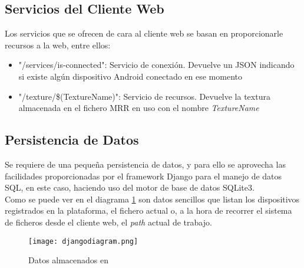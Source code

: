 \subsection{Servicios del Cliente Web}
Los servicios que se ofrecen de cara al cliente web se basan en proporcionarle recursos a la web, entre ellos:
\begin{itemize}
\item "\slash services/is-connected": Servicio de conexión. Devuelve un JSON indicando si existe algún dispositivo Android conectado en ese momento
\item "\slash texture/\$(TextureName)": Servicio de recursos. Devuelve la textura almacenada en el fichero MRR en uso con el nombre \textit{TextureName}
\end{itemize}

\subsection{Persistencia de Datos}
Se requiere de una pequeña persistencia de datos, y para ello se aprovecha las facilidades proporcionadas por el framework Django para el manejo de datos SQL, en este caso, haciendo uso del motor de base de datos SQLite3.\\

Como se puede ver en el diagrama \ref{fig:djangodiagram} son datos sencillos que listan los dispositivos registrados en la plataforma, el fichero actual o, a la hora de recorrer el sistema de ficheros desde el cliente web, el \textit{path} actual de trabajo.

\begin{figure}[h!]
\begin{center}
\texttt{[image: djangodiagram.png]}
\end{center}
\caption[Datos almacenados en \studio]{Datos almacenados en \studio}
\label{fig:djangodiagram}
\end{figure}